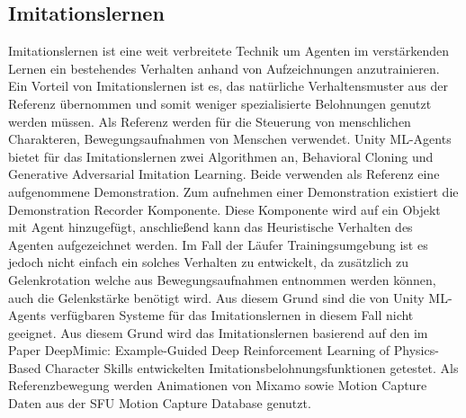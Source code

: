 \subsection{Imitationslernen}
Imitationslernen ist eine weit verbreitete Technik um Agenten im verstärkenden Lernen ein bestehendes Verhalten anhand von Aufzeichnungen anzutrainieren. Ein Vorteil von Imitationslernen ist es, das natürliche Verhaltensmuster aus der Referenz übernommen und somit weniger spezialisierte Belohnungen genutzt werden müssen. Als Referenz werden für die Steuerung von menschlichen Charakteren, Bewegungsaufnahmen von Menschen verwendet. Unity ML-Agents bietet für das Imitationslernen zwei Algorithmen an, Behavioral Cloning und Generative Adversarial Imitation Learning. Beide verwenden als Referenz eine aufgenommene Demonstration. Zum aufnehmen einer Demonstration existiert die Demonstration Recorder Komponente. Diese Komponente wird auf ein Objekt mit Agent hinzugefügt, anschließend kann das Heuristische Verhalten des Agenten aufgezeichnet werden. Im Fall der Läufer Trainingsumgebung ist es jedoch nicht einfach ein solches Verhalten zu entwickelt, da zusätzlich zu Gelenkrotation welche aus Bewegungsaufnahmen entnommen werden können, auch die Gelenkstärke benötigt wird. Aus diesem Grund sind die von Unity ML-Agents verfügbaren Systeme für das Imitationslernen in diesem Fall nicht geeignet. Aus diesem Grund wird das Imitationslernen basierend auf den im Paper \grqq{}DeepMimic: Example-Guided Deep Reinforcement Learning of Physics-Based Character Skills\grqq{} entwickelten Imitationsbelohnungsfunktionen getestet.\cite{peng2018deepmimic} Als Referenzbewegung werden Animationen von Mixamo sowie Motion Capture Daten aus der \grqq{}SFU Motion Capture Database\grqq{} genutzt.\cite{sfu-motion-capture}